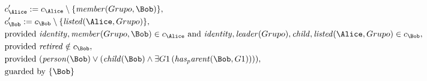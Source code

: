\begin{align*}
&
c'_
{
\Alice
}
 := 
c_
{
\Alice
}
 \setminus 
\{
\mathit{
member
}
(
Grupo
,
\Bob
)
\}
,\\
&
c'_
{
\Bob
}
 := 
c_
{
\Bob
}
 \setminus 
\{
\mathit{
listed
}
(
\Alice
,
Grupo
)
\}
,\\
&
\text{provided } 
\mathit{
identity
}
,
\mathit{
member
}
(
Grupo
,
\Bob
)
 \in c_
{
\Alice
}
 \text{ and } 
\mathit{
identity
}
,
\mathit{
leader
}
(
Grupo
)
,
\mathit{
child
}
,
\mathit{
listed
}
(
\Alice
,
Grupo
)
 \in c_
{
\Bob
}
,\\
&
\text{provided } 
\mathit{
retired
}
 \notin c_
{
\Bob
}
,\\
&
\text{provided } 
(
\mathit{
person
}
(
\Bob
)
\lor
(
\mathit{
child
}
(
\Bob
)
\land
\exists 
G1
\,(
\mathit{
has_parent
}
(
\Bob
,
G1
)
)
)
)
,\\
&
\text{guarded by } \{
\Bob
\}
\end{align*}

